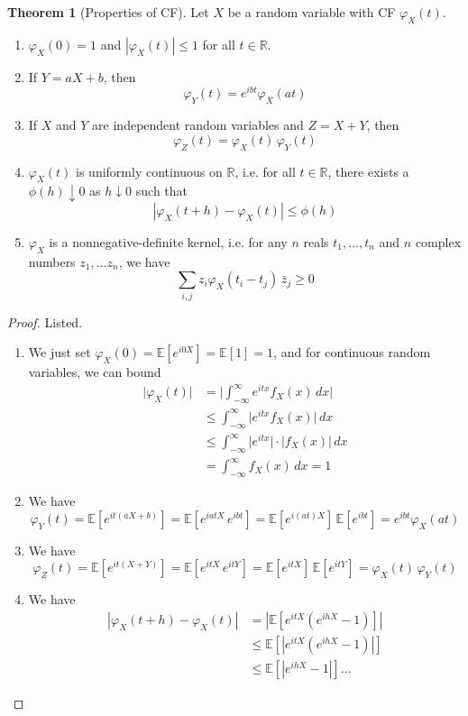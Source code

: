 \documentclass{article}
\theoremstyle{definition}
\newtheorem{theorem}{Theorem}[section]
\theoremstyle{remark}
\theoremstyle{definition}
\begin{document}
\begin{theorem}[Properties of CF]
Let $X$ be a random variable with CF $\varphi_X (t)$. 
\begin{enumerate}
    \item $\varphi_X (0) = 1$  and $|\varphi_X (t)| \leq 1$ for all $t \in \mathbb{R}$. 
    \item If $Y = a X + b$, then 
    \[\varphi_Y (t) = e^{i b t} \varphi_X (a t)\]
    \item If $X$ and $Y$ are independent random variables and $Z = X + Y$, then 
    \[\varphi_Z (t) = \varphi_X (t) \, \varphi_Y (t)\]
    \item $\varphi_X (t)$ is uniformly continuous on $\mathbb{R}$, i.e. for all $t \in \mathbb{R}$, there exists a $\phi(h) \downarrow 0$ as $h \downarrow 0$ such that 
    \[|\varphi_X (t + h) - \varphi_X (t)| \leq \phi(h)\]
    \item $\varphi_X$ is a nonnegative-definite kernel, i.e. for any $n$ reals $t_1, \ldots, t_n$ and $n$ complex numbers $z_1, \ldots z_n$, we have 
    \[\sum_{i, j} z_i \varphi_X (t_i - t_j) \, \bar{z}_j \geq 0\]
\end{enumerate}
\end{theorem}
\begin{proof}
Listed. 
\begin{enumerate}
    \item We just set $\varphi_X (0) = \mathbb{E}[e^{i 0 X}] = \mathbb{E}[1] = 1$, and for continuous random variables, we can bound 
    \begin{align*}
        \big| \varphi_X (t) \big| & = \bigg| \int_{-\infty}^\infty e^{i t x} f_X (x) \,dx  \bigg| \\
        & \leq \int_{-\infty}^\infty \big| e^{i t x} f_X (x) \big| \,dx \\
        & \leq \int_{-\infty}^\infty \big| e^{i t x} \big| \cdot \big|f_X (x) \big| \,dx \\
        & = \int_{-\infty}^\infty f_X (x) \,dx = 1 
    \end{align*}
    
    \item We have 
    \[\varphi_Y (t) = \mathbb{E}[ e^{i t (a X + b)}] = \mathbb{E}[ e^{i a t X} \, e^{i b t}] = \mathbb{E}[ e^{i (at) X}] \, \mathbb{E}[e^{i b t}] = e^{i b t} \varphi_X (a t)\]
    
    \item We have 
    \[\varphi_Z (t) = \mathbb{E}[ e^{i t (X + Y)}] = \mathbb{E}[ e^{i t X} \, e^{i t Y}] = \mathbb{E}[e^{i t X}] \, \mathbb{E}[e^{i t Y}] = \varphi_X (t) \, \varphi_Y (t)\]
    
    \item We have 
    \begin{align*}
        | \varphi_X (t + h) - \varphi_X (t)| & = | \mathbb{E} [ e^{i tX} (e^{i h X} - 1)] | \\ 
        & \leq \mathbb{E}[ | e^{i tX} (e^{i h X} - 1)|] \\
        & \leq \mathbb{E}[ |e^{i h X} - 1|] \ldots
    \end{align*}
\end{enumerate}
\end{proof}
\end{document}
